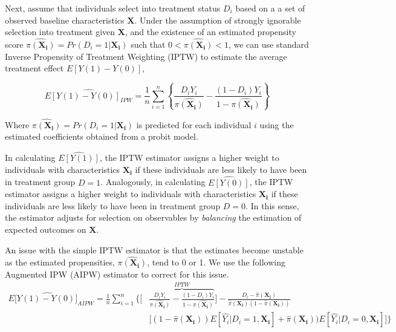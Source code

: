 Next, assume that individuals select into treatment status $D_i$ based on a a set of observed baseline characteristics $\boldsymbol{X}$. Under the assumption of strongly ignorable selection into treatment given $\boldsymbol{X}$, and the existence of an estimated propensity score $\hat{\pi({\boldsymbol{X_i}})} = Pr(D_i=1|\boldsymbol{X_i})$ such that $0<\hat{\pi({\boldsymbol{X_i}})}<1$, we can use standard Inverse Propensity of Treatment Weighting (IPTW) to estimate the average treatment effect $E[Y(1)-Y(0)]$,

\begin{equation}\label{eq:IPW}
\widehat{E[Y(1)-Y(0)]_{IPW}} = \frac{1}{n} \sum_{i=1}^{n} \left \{\frac{D_i Y_i}{\hat{\pi(\boldsymbol{X_i})}} - \frac{(1-D_i)Y_i}{1-\hat{\pi(\boldsymbol{X_i})}}\right \}
\end{equation}

\noindent Where $\hat{\pi({\boldsymbol{X_i}})} = Pr(D_i=1|\boldsymbol{X_i})$ is predicted for each individual $i$ using the estimated coefficients obtained from a probit model.

In calculating $\widehat{E[Y(1)]}$, the IPTW estimator assigns a higher weight to individuals with characteristics $\boldsymbol{X_i}$ if these individuals are less likely to have been in treatment group $D = 1$. Analogously, in calculating $\widehat{E[Y(0)]}$,  the IPTW estimator assigns a higher weight to individuals with characteristics $\boldsymbol{X_i}$ if these individuals are less likely to have been in treatment group $D = 0$. In this sense, the estimator adjusts for selection on observables by \textit{balancing} the estimation of expected outcomes on $\boldsymbol{X}$.

An issue with the simple IPTW estimator is that the estimates become unstable as the estimated propensities, $\hat{\pi(\boldsymbol{X_i})}$, tend to 0 or 1. We use the following Augmented IPW (AIPW) estimator to correct for this issue. 
\begin{align}\label{eq:AIPW}
E[\widehat{Y(1)-Y(0)]}_{AIPW} = \frac{1}{n} \sum_{i=1}^{n} \bigg \{ \bigg[ & \overbrace{\frac{D_i Y_i}{\hat{\pi(\boldsymbol{X_i})}} - \frac{(1-D_i)Y_i}{1-\hat{\pi(\boldsymbol{X_i})}}}^{IPTW} \bigg]- \frac{D_i - \hat{\pi}(\boldsymbol{X_i})}{\hat{\pi}(\boldsymbol{X_i}) (1-\hat{\pi}(\boldsymbol{X_i}))} \nonumber \\[10pt]
& \bigg[ (1-\hat{\pi}(\boldsymbol{X_i})) E[\hat{Y_i}|D_i=1,\boldsymbol{X_i}] + \hat{\pi}(\boldsymbol{X_i})) E[\hat{Y_i}|D_i=0,\boldsymbol{X_i}] \bigg] \bigg \}
\end{align}

